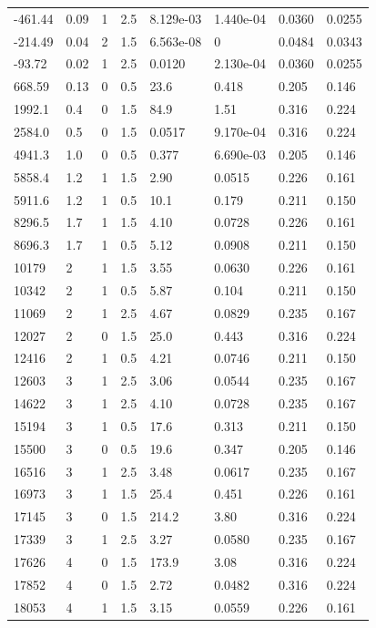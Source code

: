 \documentclass[preview]{standalone}
\begin{document}
{{\begin{tabular}{L{1.2cm}C{1.2cm} C{0.3cm}C{0.5cm} C{1.4cm}C{1.4cm} C{1.4cm}C{1.4cm}}
  -461.44  &  0.09  & 1     & 2.5 &  8.129e-03  & 1.440e-04  & 0.0360 &  0.0255   \\ 
  -214.49  &  0.04  & 2     & 1.5 &  6.563e-08  & 0  & 0.0484 &  0.0343   \\ 
  -93.72  &  0.02  & 1     & 2.5 &  0.0120  & 2.130e-04  & 0.0360 &  0.0255   \\ 
  668.59  &  0.13  & 0     & 0.5 &  23.6  & 0.418  & 0.205 &  0.146   \\ 
  1992.1  &   0.4  & 0     & 1.5 &  84.9  & 1.51  & 0.316 &  0.224   \\ 
  2584.0  &   0.5  & 0     & 1.5 &  0.0517  & 9.170e-04  & 0.316 &  0.224   \\ 
  4941.3  &   1.0  & 0     & 0.5 &  0.377  & 6.690e-03  & 0.205 &  0.146   \\ 
  5858.4  &   1.2  & 1     & 1.5 &  2.90  & 0.0515  & 0.226 &  0.161   \\ 
  5911.6  &   1.2  & 1     & 0.5 &  10.1  & 0.179  & 0.211 &  0.150   \\ 
  8296.5  &   1.7  & 1     & 1.5 &  4.10  & 0.0728  & 0.226 &  0.161   \\ 
  8696.3  &   1.7  & 1     & 0.5 &  5.12  & 0.0908  & 0.211 &  0.150   \\ 
  10179  &     2  & 1     & 1.5 &  3.55  & 0.0630  & 0.226 &  0.161   \\ 
  10342  &     2  & 1     & 0.5 &  5.87  & 0.104  & 0.211 &  0.150   \\ 
  11069  &     2  & 1     & 2.5 &  4.67  & 0.0829  & 0.235 &  0.167   \\ 
  12027  &     2  & 0     & 1.5 &  25.0  & 0.443  & 0.316 &  0.224   \\ 
  12416  &     2  & 1     & 0.5 &  4.21  & 0.0746  & 0.211 &  0.150   \\ 
  12603  &     3  & 1     & 2.5 &  3.06  & 0.0544  & 0.235 &  0.167   \\ 
  14622  &     3  & 1     & 2.5 &  4.10  & 0.0728  & 0.235 &  0.167   \\ 
  15194  &     3  & 1     & 0.5 &  17.6  & 0.313  & 0.211 &  0.150   \\ 
  15500  &     3  & 0     & 0.5 &  19.6  & 0.347  & 0.205 &  0.146   \\ 
  16516  &     3  & 1     & 2.5 &  3.48  & 0.0617  & 0.235 &  0.167   \\ 
  16973  &     3  & 1     & 1.5 &  25.4  & 0.451  & 0.226 &  0.161   \\ 
  17145  &     3  & 0     & 1.5 &  214.2  & 3.80  & 0.316 &  0.224   \\ 
  17339  &     3  & 1     & 2.5 &  3.27  & 0.0580  & 0.235 &  0.167   \\ 
  17626  &     4  & 0     & 1.5 &  173.9  & 3.08  & 0.316 &  0.224   \\ 
  17852  &     4  & 0     & 1.5 &  2.72  & 0.0482  & 0.316 &  0.224   \\ 
  18053  &     4  & 1     & 1.5 &  3.15  & 0.0559  & 0.226 &  0.161   \\ 
\hline 
\end{tabular} 

}}
\end{document}
